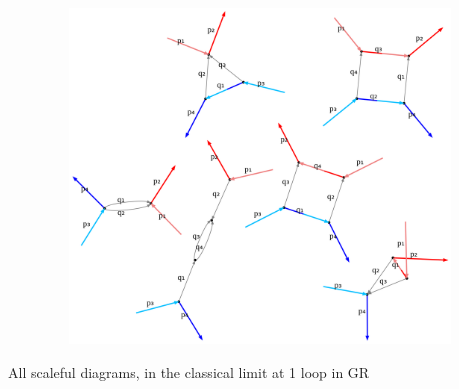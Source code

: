 \documentclass[
  11pt,
  a4paper,
  DIV=11,
  numbers=noendperiod,
  oneside]{scrreprt}
\DeclareRobustCommand{\[}{\begin{equation}}
\DeclareRobustCommand{\]}{\end{equation}}
\begin{document}
\hypertarget{fig-1lGRclassical}{}
{
\makeatletter
\def\LT@makecaption#1#2#3{%
  \noalign{\smash{\hbox{\kern\textwidth\rlap{\kern\marginparsep
  \parbox[t]{\marginparwidth}{%
    \footnotesize{%
      \vspace{(1.1\baselineskip)}
    #1{#2: }\ignorespaces #3}}}}}}%
    }
\makeatother

\begin{figure}[H]

{\centering \includegraphics[width=8in,height=3.5in]{./scattering_files/figure-latex/dot-figure-3.png}

}

\end{figure}

\label{fig-1lGRclassical}All scaleful diagrams, in the classical limit
at 1 loop in GR

}
\end{document}
